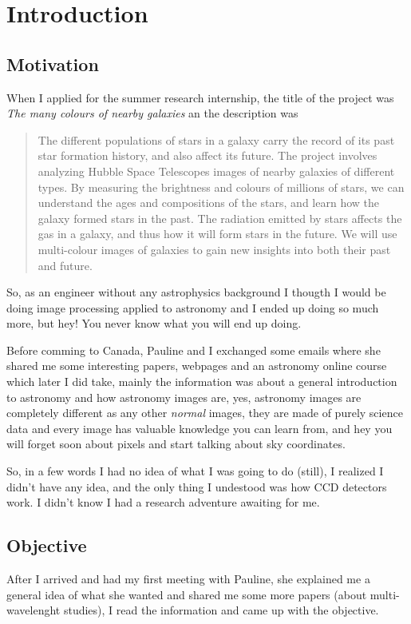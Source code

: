 
\chapter{Introduction}

\section{Motivation}
When I applied for the summer research internship, the title of the project was \emph{The many colours of nearby galaxies} an the description was
\begin{quote}
The different populations of stars in a galaxy carry the record of its past star formation history, and also affect its future. The project involves  analyzing Hubble Space Telescopes images of nearby galaxies of different types. By measuring the brightness and colours of millions of stars, we can understand the ages and compositions of the stars, and learn how the galaxy formed stars in the past. The radiation emitted by stars affects the gas in a galaxy, and thus how it will form stars in the future. We will use multi-colour images of galaxies to gain new insights into both their past and future.
\end{quote}

So, as an engineer without any astrophysics background I thougth I would be doing image processing applied to astronomy and I ended up doing so much more, but hey! You never know what you will end up doing.

Before comming to Canada, Pauline and I exchanged some emails where she shared me some interesting papers, webpages and an astronomy online course which later I did take, mainly the information was about a general introduction to astronomy and how astronomy images are, yes, astronomy images are completely different as any other \emph{normal} images, they are made of purely science data and every image has valuable knowledge you can learn from, and hey you will forget soon about pixels and start talking about sky coordinates.

So, in a few words I had no idea of what I was going to do (still), I realized I didn't have any idea, and the only thing I undestood was how CCD detectors work. I didn't know I had a research adventure awaiting for me.

\section{Objective}
After I arrived and had my first meeting with Pauline, she explained me a general idea of what she wanted and shared me some more papers (about multi-wavelenght studies), I read the information and came up with the objective.

